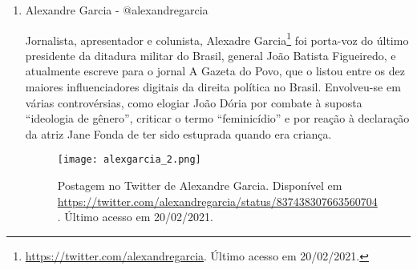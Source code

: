\documentclass[
	12pt,				%
	openright,			%
	twoside,			%
	a4paper,			%
	english,			%
	brazil				%
	]{abntex2}
\begin{document}
\begin{anexosenv}
\begin{enumerate}
 Bacharel em direito e atual vereador de Salvador pelo Partido Democratas (DEM), Alexandre Aleluia\footnote{\url{https://twitter.com/AlexAleluia}. Último acesso em 20/02/2021.} é apoiador declarado do governo Bolsonaro e filho de José Carlos Aleluia, também político e apoiador de Bolsonaro. Alexandre teve muitos posicionamentos contrários às pautas feministas, como o direito ao aborto, e também tentou revogar a Lei Teu Nascimento (PL 9498/2019), que pune com multas estabelecimentos que cometam ato de homofobia. O vereador ainda apresentou projeto de lei contra a suposta ``ideologia de gênero'' em Salvador e demonstra contrariedade ao feminismo em redes sociais.

 \begin{figure}[!htbp]
    \centering
    \texttt{[image: alexandreal\_1.png]}
    \caption{Postagem no Twitter de Alexandre Aleluia. Vereador acusa Professora Dayane Pimental (ver \ref{depdp}), também conservadora, de performar ``vitimismo feminista''. Disponível em \url{https://twitter.com/alexaleluia/status/1331363942430633989}. Último acesso em 20/02/2021.}
    \label{fig:aleluia}
 \end{figure}

 \item Alexandre Garcia - @alexandregarcia
 
 Jornalista, apresentador e colunista, Alexadre Garcia\footnote{\url{https://twitter.com/alexandregarcia}. Último acesso em 20/02/2021.} foi porta-voz do último presidente da ditadura militar do Brasil, general João Batista Figueiredo, e atualmente escreve para o jornal A Gazeta do Povo, que o listou entre os dez maiores influenciadores digitais da direita política no Brasil. Envolveu-se em várias controvérsias, como elogiar João Dória por combate à suposta ``ideologia de gênero'', criticar o termo ``feminicídio'' e por reação à declaração da atriz Jane Fonda de ter sido estuprada quando era criança.


 \begin{figure}[!htbp]
    \centering
    \texttt{[image: alexgarcia\_2.png]}
    \caption{Postagem no Twitter de Alexandre Garcia. Disponível em \url{https://twitter.com/alexandregarcia/status/837438307663560704}. Último acesso em 20/02/2021.}
    \label{fig:garciafonda}
 \end{figure}


\end{enumerate}
\end{anexosenv}
\end{document}
